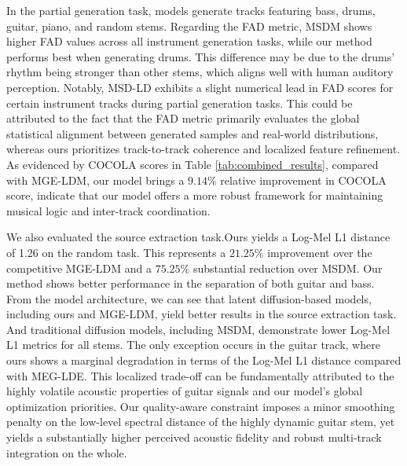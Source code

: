 \documentclass[lettersize,journal]{IEEEtran}
\begin{document}
In the partial generation task, models generate tracks featuring bass, drums, guitar, piano, and random stems. Regarding the FAD metric, MSDM shows higher FAD values across all instrument generation tasks, while our method performs best when generating drums. This difference may be due to the drums' rhythm being stronger than other stems, which aligns well with human auditory perception. Notably, MSD-LD exhibits a slight numerical lead in FAD scores for certain instrument tracks during partial generation tasks. This could be attributed to the fact that the FAD metric primarily evaluates the global statistical alignment between generated samples and real-world distributions, whereas ours prioritizes track-to-track coherence and localized feature refinement. As evidenced by COCOLA scores in Table \ref{tab:combined_results}, compared with MGE-LDM, our model brings a $9.14\%$ relative improvement in COCOLA score, indicate that our model offers a more robust framework for maintaining musical logic and inter-track coordination.

We also evaluated the source extraction task.Ours yields a Log-Mel L1 distance of 1.26 on the random task. This represents a $21.25\%$ improvement over the competitive MGE-LDM and a $75.25\%$ substantial reduction over MSDM. Our method shows better performance in the separation of both guitar and bass. From the model architecture, we can see that latent diffusion-based models, including ours and MGE-LDM, yield better results in the source extraction task. And traditional diffusion models, including MSDM, demonstrate lower Log-Mel L1 metrics for all stems. The only exception occurs in the guitar track, where ours shows a marginal degradation in terms of the Log-Mel L1 distance compared with MEG-LDE. This localized trade-off can be fundamentally attributed to the highly volatile acoustic properties of guitar signals and our model's global optimization priorities. Our quality-aware constraint imposes a minor smoothing penalty on the low-level spectral distance of the highly dynamic guitar stem, yet yields a substantially higher perceived acoustic fidelity and robust multi-track integration on the whole.
\end{document}
